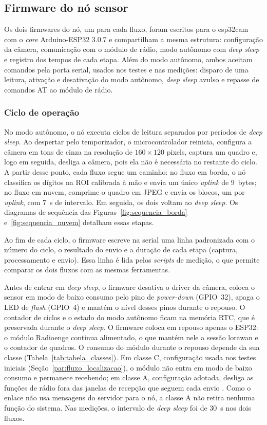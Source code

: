 \subsection{Firmware do nó sensor}
\label{subsec:firmware}

Os dois firmwares do nó, um para cada fluxo, foram escritos para o \gls{esp32cam} com o
\textit{core} Arduino-ESP32 3.0.7 e compartilham a mesma estrutura: configuração da câmera,
comunicação com o módulo de rádio, modo autônomo com \textit{deep sleep} e registro dos
tempos de cada etapa. Além do modo autônomo, ambos aceitam comandos pela porta serial,
usados nos testes e nas medições: disparo de uma leitura, ativação e desativação do modo
autônomo, \textit{deep sleep} avulso e repasse de comandos AT ao módulo de rádio.

\subsubsection{Ciclo de operação}
\label{subsubsec:ciclo_operacao}

No modo autônomo, o nó executa ciclos de leitura separados por períodos de
\textit{deep sleep}. Ao despertar pelo temporizador, o microcontrolador reinicia, configura
a câmera em tons de cinza na resolução de $160 \times 120$ pixels, captura um quadro e,
logo em seguida, desliga a câmera, pois ela não é necessária no restante do ciclo. A
partir desse ponto, cada fluxo segue um caminho: no fluxo em borda, o nó classifica os
dígitos na ROI calibrada à mão e envia um único \textit{uplink} de 9~bytes; no fluxo em
nuvem, comprime o quadro em JPEG e envia os blocos, um por \textit{uplink}, com 7~s de
intervalo. Em seguida, os dois voltam ao \textit{deep sleep}. Os diagramas de sequência
das Figuras~\ref{fig:sequencia_borda} e~\ref{fig:sequencia_nuvem} detalham essas etapas.

Ao fim de cada ciclo, o firmware escreve na serial uma linha padronizada com o número do
ciclo, o resultado do envio e a duração de cada etapa (captura, processamento e envio).
Essa linha é lida pelos \textit{scripts} de medição, o que permite comparar os dois fluxos
com as mesmas ferramentas.

Antes de entrar em \textit{deep sleep}, o firmware desativa o driver da câmera, coloca o
sensor em modo de baixo consumo pelo pino de \textit{power-down} (GPIO~32), apaga o LED
de \textit{flash} (GPIO~4) e mantém o nível desses pinos durante o repouso. O contador de
ciclos e o estado do modo autônomo ficam na memória RTC, que é preservada durante o
\textit{deep sleep}. O firmware coloca em repouso apenas o ESP32: o módulo Radioenge
continua alimentado, o que mantém nele a sessão \gls{lorawan} e o contador de quadros. O
consumo do módulo durante o repouso depende da sua classe
(Tabela~\ref{tab:tabela_classes}). Em classe C, configuração usada nos testes iniciais
(Seção~\ref{par:fluxo_localizacao}), o módulo não entra em modo de baixo consumo e permanece recebendo; em classe A, configuração adotada, desliga as funções de rádio fora das janelas de recepção que seguem cada
envio \cite{radioenge2022}. Como o enlace não usa mensagens do servidor para o nó, a classe
A não retira nenhuma função do sistema. Nas medições, o intervalo de \textit{deep sleep}
foi de 30~s nos dois fluxos.

